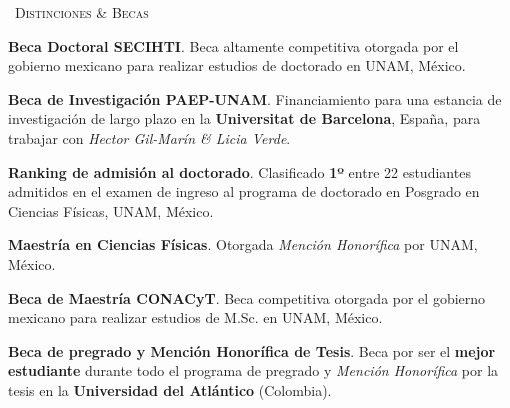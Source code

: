 \begin{rubric}{\faTrophy\ \textsc{Distinciones \& Becas}}

\entry*[2022--presente]%
  \textbf{Beca Doctoral SECIHTI}. Beca altamente competitiva otorgada por el gobierno mexicano para realizar estudios de doctorado en UNAM, México. \par

\entry*[2023]%
  \textbf{Beca de Investigación PAEP-UNAM}. Financiamiento para una estancia de investigación de largo plazo en la \textbf{Universitat de Barcelona}, España, para trabajar con \textit{Hector Gil-Marín \& Licia Verde}.

\entry*[2022]%
  \textbf{Ranking de admisión al doctorado}. Clasificado \textbf{1º} entre 22 estudiantes admitidos en el examen de ingreso al programa de doctorado en Posgrado en Ciencias Físicas, UNAM, México.

\entry*[2021]%
  \textbf{Maestría en Ciencias Físicas}. Otorgada \textit{Mención Honorífica} por UNAM, México.

\entry*[2020--2021]%
  \textbf{Beca de Maestría CONACyT}. Beca competitiva otorgada por el gobierno mexicano para realizar estudios de M.Sc. en UNAM, México.

\entry*[2014--2019]%
  \textbf{Beca de pregrado y Mención Honorífica de Tesis}. Beca por ser el \textbf{mejor estudiante} durante todo el programa de pregrado y \textit{Mención Honorífica} por la tesis en la \textbf{Universidad del Atlántico} (Colombia).

\end{rubric}
